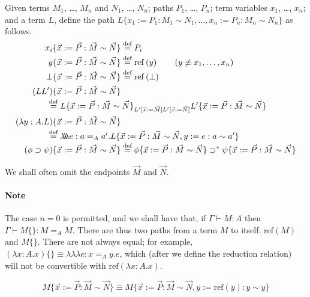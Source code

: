 \documentclass[a4paper,UKenglish]{lipics-v2016}
\newcommand*{\eqdef}{\mathrel{\smash{\stackrel{\text{def}}{=}}}}
\newcommand*{\reff}[1]{\ensuremath{\mathrm{ref} \left( {#1} \right)}}
\newcommand*{\triplelambda}{\ensuremath{\lambda \!\! \lambda \!\! \lambda}}
\theoremstyle{plain}
\begin{document}
\begin{definition}
Given terms $M_1$, \ldots, $M_n$ and $N_1$, \ldots, $N_n$; paths $P_1$, \ldots, $P_n$; term variables $x_1$, \ldots, $x_n$; and a term $L$, define the path $L \{ x_1 := P_1 : M_1 \sim N_1 , \ldots, x_n := P_n : M_n \sim N_n \}$ as follows.
\begin{align*}
x_i \{ \vec{x} := \vec{P} : \vec{M} \sim \vec{N} \} & \eqdef P_i \\
y \{ \vec{x} := \vec{P} : \vec{M} \sim \vec{N} \} & \eqdef \reff{y} \qquad (y \not\equiv x_1, \ldots, x_n) \\
\bot \{ \vec{x} := \vec{P} : \vec{M} \sim \vec{N} \} & \eqdef \reff{\bot} \\
(LL') \{ \vec{x} := \vec{P} : \vec{M} \sim \vec{N} \} \\
\omit\rlap{\qquad \qquad $\eqdef L \{ \vec{x} := \vec{P} : \vec{M} \sim \vec{N} \}_{L' [\vec{x} := \vec{M}] L' [\vec{x} := \vec{N}]} L' \{ \vec{x} := \vec{P} : \vec{M} \sim \vec{N} \}$} \\
(\lambda y:A.L) \{ \vec{x} := \vec{P} : \vec{M} \sim \vec{N} \} & \\
\omit\rlap{\qquad\qquad $\eqdef \triplelambda e : a =_A a' . L \{ \vec{x} := \vec{P} : \vec{M} \sim \vec{N} , y := e : a \sim a' \}$} \\
(\phi \supset \psi) \{ \vec{x} := \vec{P} : \vec{M} \sim \vec{N} \} & \eqdef \phi \{ \vec{x} := \vec{P} : \vec{M} \sim \vec{N} \} \supset^* \psi \{ \vec{x} := \vec{P} : \vec{M} \sim \vec{N} \}
\end{align*}
\end{definition}

We shall often omit the endpoints $\vec{M}$ and $\vec{N}$.

\paragraph*{Note}
The case $n = 0$ is permitted, and we shall have that, if $\Gamma \vdash M : A$ then $\Gamma \vdash M \{\} : M =_A M$.  There are thus two paths from a term $M$ to itself: $\reff{M}$ and $M \{\}$.  There are not always equal; for example, $(\lambda x:A.x) \{\} \equiv \triplelambda e : x =_A y. e$, which (after we define the reduction relation) will not be convertible with $\reff{\lambda x:A.x}$.

\begin{lemma}
\[ M \{ \vec{x} := \vec{P} : \vec{M} \sim \vec{N} \} \equiv M \{ \vec{x} := \vec{P} : \vec{M} \sim \vec{N}, y := \reff{y} : y \sim y \} \]
\end{lemma}
\end{document}
